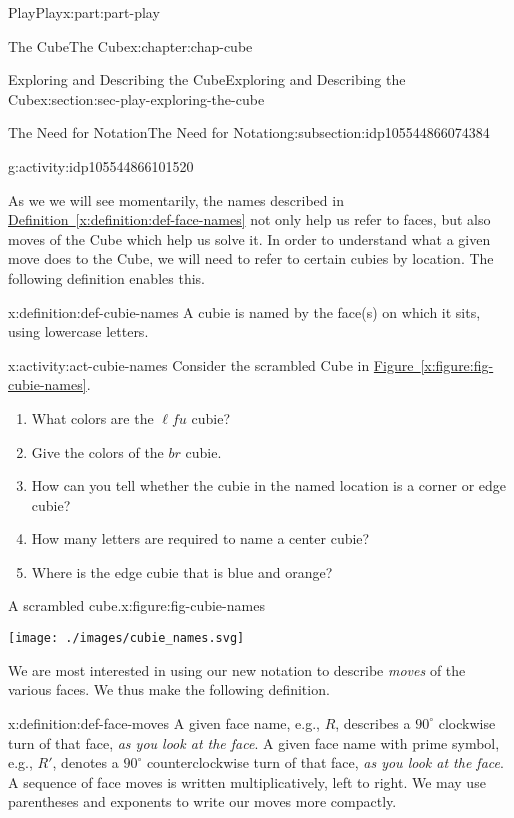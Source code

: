 \documentclass[oneside,10pt,]{book}
\newcommand{\xreffont}{\relax}
\numberwithin{equation}{section}
\begin{document}
\begin{partptx}{Play}{}{Play}{}{}{x:part:part-play}
\begin{chapterptx}{The Cube}{}{The Cube}{}{}{x:chapter:chap-cube}
\begin{sectionptx}{Exploring and Describing the Cube}{}{Exploring and Describing the Cube}{}{}{x:section:sec-play-exploring-the-cube}
\begin{subsectionptx}{The Need for Notation}{}{The Need for Notation}{}{}{g:subsection:idp105544866074384}
\begin{activity}{}{g:activity:idp105544866101520}
\end{activity}%
As we we will see momentarily, the names described in \hyperref[x:definition:def-face-names]{Definition~{\xreffont\ref{x:definition:def-face-names}}} not only help us refer to faces, but also moves of the Cube which help us solve it. In order to understand what a given move does to the Cube, we will need to refer to certain cubies by location. The following definition enables this.%
\begin{definition}{}{x:definition:def-cubie-names}%
A cubie is named by the face(s) on which it sits, using lowercase letters.%
\end{definition}
\begin{activity}{}{x:activity:act-cubie-names}%
Consider the scrambled Cube in \hyperref[x:figure:fig-cubie-names]{Figure~{\xreffont\ref{x:figure:fig-cubie-names}}}.%
%
\begin{enumerate}
\item{}What colors are the \(\ell f u\) cubie?%
\item{}Give the colors of the \(br\) cubie.%
\item{}How can you tell whether the cubie in the named location is a corner or edge cubie?%
\item{}How many letters are required to name a center cubie?%
\item{}Where is the edge cubie that is blue and orange?%
\end{enumerate}
\begin{figureptx}{A scrambled cube.}{x:figure:fig-cubie-names}{}%
\begin{image}{0.25}{0.5}{0.25}%
\texttt{[image: ./images/cubie\_names.svg]}
\end{image}%
\tcblower
\end{figureptx}%
\end{activity}%
We are most interested in using our new notation to describe \emph{moves} of the various faces. We thus make the following definition.%
\begin{definition}{}{x:definition:def-face-moves}%
%
A given face name, e.g., \(R\), describes a \(90^\circ\) clockwise turn of that face, \emph{as you look at the face}. A given face name with prime symbol, e.g., \(R'\), denotes a \(90^\circ\) counterclockwise turn of that face, \emph{as you look at the face}. A sequence of face moves is written multiplicatively, left to right. We may use parentheses and exponents to write our moves more compactly.%
\end{definition}

\end{subsectionptx}
\end{sectionptx}
\end{chapterptx}
\end{partptx}
\end{document}
